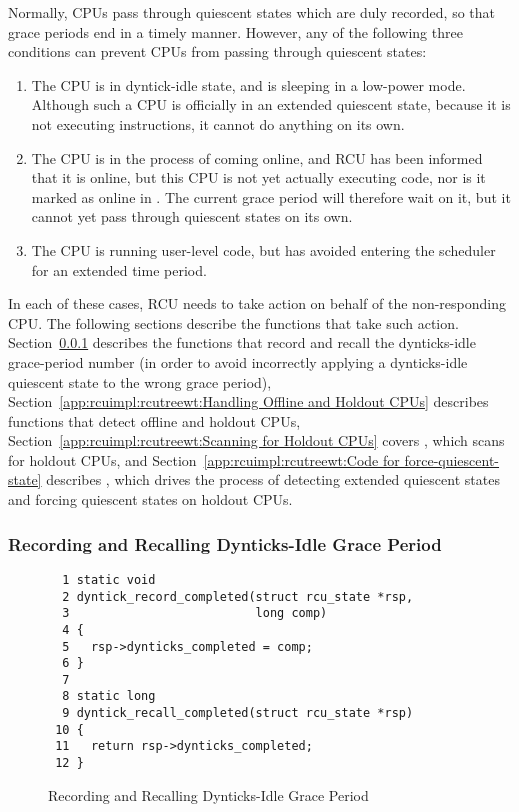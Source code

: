 Normally, CPUs pass through quiescent states which are duly recorded,
so that grace periods end in a timely manner.
However, any of the following three conditions can prevent CPUs from
passing through quiescent states:

\begin{enumerate}
\item	The CPU is in dyntick-idle state, and is sleeping in a low-power
	mode.
	Although such a CPU is officially in an extended quiescent state,
	because it is not executing instructions, it cannot do anything
	on its own.
\item	The CPU is in the process of coming online, and RCU has been
	informed that it is online, but this CPU is not yet actually
	executing code, nor is it marked as online in .
	The current grace period will therefore wait on it, but it cannot
	yet pass through quiescent states on its own.
\item	The CPU is running user-level code, but has avoided
	entering the scheduler for an extended time period.
\end{enumerate}

In each of these cases, RCU needs to take action on behalf of the
non-responding CPU.
The following sections describe the functions that take such action.
Section~\ref{app:rcuimpl:rcutreewt:Recording and Recalling Dynticks-Idle Grace Period}
describes the functions that record and recall the dynticks-idle
grace-period number (in order to avoid incorrectly applying a dynticks-idle
quiescent state to the wrong grace period),
Section~\ref{app:rcuimpl:rcutreewt:Handling Offline and Holdout CPUs}
describes functions that detect offline and holdout CPUs,
Section~\ref{app:rcuimpl:rcutreewt:Scanning for Holdout CPUs}
covers , which scans for holdout CPUs, and
Section~\ref{app:rcuimpl:rcutreewt:Code for force-quiescent-state}
describes , which drives the process of
detecting extended quiescent states and forcing quiescent states on
holdout CPUs.

\subsubsection{Recording and Recalling Dynticks-Idle Grace Period}
\label{app:rcuimpl:rcutreewt:Recording and Recalling Dynticks-Idle Grace Period}

\begin{figure}[tbp]
{ \scriptsize
\begin{verbatim}
  1 static void
  2 dyntick_record_completed(struct rcu_state *rsp,
  3                          long comp)
  4 {
  5   rsp->dynticks_completed = comp;
  6 }
  7
  8 static long
  9 dyntick_recall_completed(struct rcu_state *rsp)
 10 {
 11   return rsp->dynticks_completed;
 12 }
\end{verbatim}
}
\caption{Recording and Recalling Dynticks-Idle Grace Period}
\label{fig:app:rcuimpl:rcutreewt:Recording and Recalling Dynticks-Idle Grace Period}
\end{figure}

